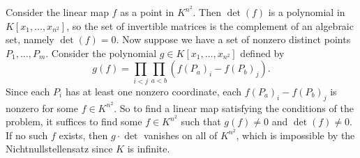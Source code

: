 \documentclass[11pt,letterpaper]{article}
\begin{document}
\begin{solution}
    Consider the linear map $f$ as a point in $K^{n^2}$. Then $\det(f)$ is a polynomial in $K[x_1,\ldots,x_{n^2}]$, so the set of invertible matrices is the complement of an algebraic set, namely $\det(f)=0$. Now suppose we have a set of nonzero distinct points $P_1,\ldots,P_m$. Consider the polynomial $g\in K[x_1,\ldots,x_{n^2}]$ defined by
    \[
        g(f)=\prod_{i< j}\prod_{a< b}(f(P_a)_i - f(P_b)_j)
    .\] 
    Since each $P_i$ has at least one nonzero coordinate, each $f(P_a)_i-f(P_b)_j$ is nonzero for some $f\in K^{n^2}$. So to find a linear map satisfying the conditions of the problem, it suffices to find some $f\in K^{n^2}$ such that $g(f)\neq 0$ and $\det(f)\neq 0$. If no such $f$ exists, then $g\cdot \det$ vanishes on all of $K^{n^2}$, which is impossible by the Nichtnullstellensatz since $K$ is infinite.    
\end{solution}
\end{document}
